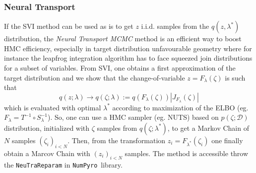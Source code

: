 \documentclass[twocolumn,twocolappendix,nofootinbib]{openjournal}
\newcommand{\numpyro}{\texttt{NumPyro}}
\newcommand{\bydef}{:=}
\begin{document}
\subsubsection{Neural Transport}
\label{sec-Neural-Reparametrisation}
%
If the SVI method can be used as is to get $z$ i.i.d. samples from the $q(z,\lambda^\ast)$ distribution, the \textit{Neural Transport MCMC} method \citep{2014arXiv1412.5492P,2019arXiv190303704H} is an efficient way to boost HMC efficiency, especially in target distribution unfavourable geometry where for instance the leapfrog integration algorithm has to face squeezed join distributions for a subset of variables. From SVI, one obtains a first approximation of the target distribution and we show that the change-of-variable $z=F_\lambda(\zeta)$ is such that
\begin{equation}
q(z;\lambda) \rightarrow q(\zeta;\lambda) \bydef q(F_\lambda(\zeta)) |J_{F_\lambda}(\zeta)|
\end{equation}
which is evaluated with optimal $\lambda^\ast$ according to maximization of the ELBO (eg. $F_\lambda=T^{-1}\circ S^{-1}_\lambda$). So, one can use a HMC sampler (eg. NUTS) based on $p(\zeta;\mathcal{D})$ distribution, initialized with $\zeta$ samples from $q(\zeta;\lambda^\ast)$, to get a Markov Chain of $N$ samples $(\zeta_i)_{i<N}$. Then, from the transformation  $z_i=F_{\lambda^\ast}(\zeta_i)$ one finally obtain a Marcov Chain with $(z_i)_{i<N}$ samples. The method is accessible throw the \verb|NeuTraReparam| in \numpyro\ library.


%
\end{document}
